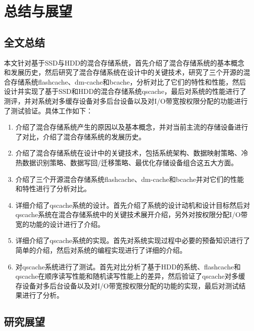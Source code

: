 

\chapter{总结与展望}
\label{chap:summary}

\section{全文总结}

本文针对基于SSD与HDD的混合存储系统，首先介绍了混合存储系统的基本概念和发展历史，然后研究了混合存储系统在设计中的关键技术，研究了三个开源的混合存储系统flashcache、dm-cache和bcache，分析对比了它们的特性和性能，然后设计并实现了基于SSD和HDD的混合存储系统qscache，最后对系统的性能进行了测评，并对系统对多缓存设备对多后台设备以及对I/O带宽按权限分配的功能进行了测试验证。具体工作如下：

\begin{enumerate}
    \item 介绍了混合存储系统产生的原因以及基本概念，并对当前主流的存储设备进行了对比，介绍了混合存储系统的发展历史。
    \item 介绍了混合存储系统在设计中的关键技术，包括系统架构、数据映射策略、冷热数据识别策略、数据写回/迁移策略、最优化存储设备组合这五大方面。
    \item 介绍了三个开源混合存储系统flashcache、dm-cache和bcache并对它们的性能和特性进行了分析对比。
    \item 详细介绍了qscache系统的设计。首先介绍了系统的设计动机和设计目标然后对qscache系统在混合存储系统中的关键技术展开介绍，另外对按权限分配I/O带宽的功能的设计进行了介绍。
    \item 详细介绍了qscache系统的实现。首先对系统实现过程中必要的预备知识进行了简单的介绍，然后对系统的编程实现进行了详细的介绍。
    \item 对qscache系统进行了测试。首先对比分析了基于HDD的系统、flashcache和qscache在顺序读写性能和随机读写性能上的差异，然后验证了qscache对多缓存设备对多后台设备以及对I/O带宽按权限分配的功能的实现，最后对测试结果进行了分析。
\end{enumerate}

\section{研究展望}


